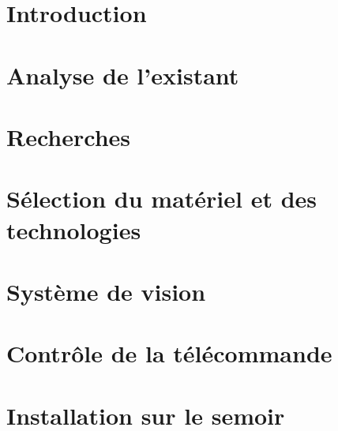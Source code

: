 \documentclass[
    iai, %
    eai, %
]{heig-tb}
\begin{document}
\maketitle
\frontmatter
\clearemptydoublepage

\preamble
\authentification

\begin{abstract}
    
\end{abstract}

\clearemptydoublepage
{
    \tableofcontents
    \let\cleardoublepage\clearpage
    \listoffigures
    \let\cleardoublepage\clearpage
    \listoftables
    \let\cleardoublepage\clearpage
    \listoflistings
}

\printnomenclature
\clearemptydoublepage
{}

\mainmatter
\chapter{Introduction}

%

\chapter{Analyse de l'existant}
\label{chap:exi}


\chapter{Recherches}


\chapter{Sélection du matériel et des technologies}


\chapter{Système de vision}


\chapter{Contrôle de la télécommande}


\chapter{Installation sur le semoir}

\end{document}
